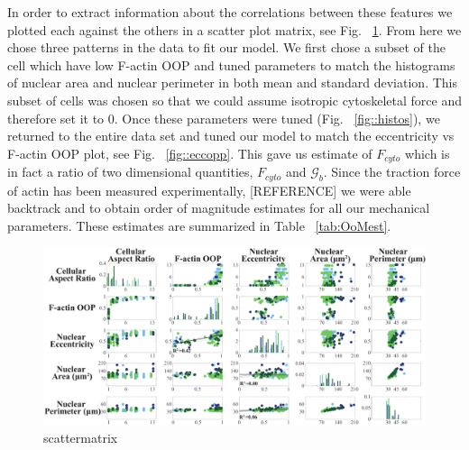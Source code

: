 In order to extract information about the correlations between these features we plotted each against the others in a scatter plot matrix, see Fig. ~\ref{fig::scattermatrix}. From here we chose three patterns in the data to fit our model. We first chose a subset of the cell which have low F-actin OOP and tuned parameters to match the histograms of nuclear area and nuclear perimeter in both mean and standard deviation. This subset of cells was chosen so that we could assume isotropic cytoskeletal force and therefore set it to 0. Once these parameters were tuned (Fig. ~\ref{fig::histos}), we returned to the entire data set and tuned our model to match the eccentricity vs F-actin OOP plot, see Fig. ~\ref{fig::eccopp}. This gave us estimate of $F_{cyto}$ which is in fact a ratio of two dimensional quantities, $F_{cyto}$ and  $\mathcal{G}_b$. Since the traction force of actin has been measured experimentally, [REFERENCE] we were able backtrack and to obtain order of magnitude estimates for all our mechanical parameters. These estimates are summarized in Table ~\ref{tab:OoMest}.

\begin{figure}[h]
\centering
\captionsetup{width=.9\linewidth}
\includegraphics[width=6in]{Project3/figs/Nancy_data.pdf}
\caption{scattermatrix}
\label{fig::scattermatrix}
\end{figure}


